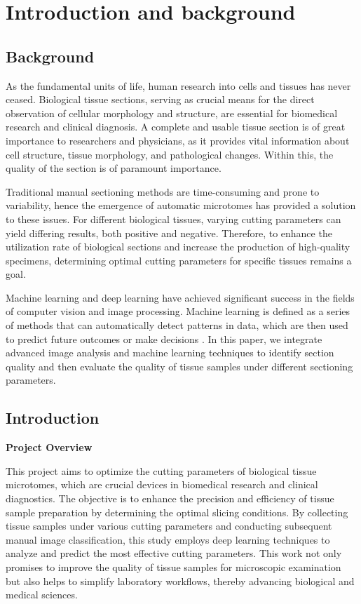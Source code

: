 \section{Introduction and background}
\label{sec:introduction}
\subsection{Background}

As the fundamental units of life, human research into cells and tissues has never ceased. Biological tissue sections, serving as crucial means for the direct observation of cellular morphology and structure, are essential for biomedical research and clinical diagnosis. A complete and usable tissue section is of great importance to researchers and physicians, as it provides vital information about cell structure, tissue morphology, and pathological changes. Within this, the quality of the section is of paramount importance.

Traditional manual sectioning methods are time-consuming and prone to variability, hence the emergence of automatic microtomes has provided a solution to these issues. For different biological tissues, varying cutting parameters can yield differing results, both positive and negative. Therefore, to enhance the utilization rate of biological sections and increase the production of high-quality specimens, determining optimal cutting parameters for specific tissues remains a goal.

Machine learning and deep learning have achieved significant success in the fields of computer vision and image processing. Machine learning is defined as a series of methods that can automatically detect patterns in data, which are then used to predict future outcomes or make decisions \cite{1.1}. In this paper, we integrate advanced image analysis and machine learning techniques to identify section quality and then evaluate the quality of tissue samples under different sectioning parameters.

\subsection{Introduction}
\textbf{Project Overview}

This project aims to optimize the cutting parameters of biological tissue microtomes, which are crucial devices in biomedical research and clinical diagnostics. The objective is to enhance the precision and efficiency of tissue sample preparation by determining the optimal slicing conditions. By collecting tissue samples under various cutting parameters and conducting subsequent manual image classification, this study employs deep learning techniques to analyze and predict the most effective cutting parameters. This work not only promises to improve the quality of tissue samples for microscopic examination but also helps to simplify laboratory workflows, thereby advancing biological and medical sciences.


